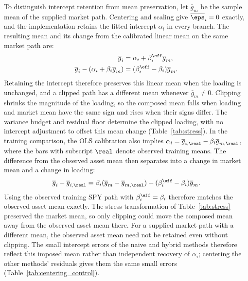 To distinguish intercept retention from mean preservation, let
$\overline{g}_m$ be the sample mean of the supplied market path.
Centering and scaling give $\overline{\eps}_i=0$ exactly, and the
implementation retains the fitted intercept $\alpha_i$ in every
branch. The resulting mean and its change from the calibrated linear
mean on the same market path are:
\begin{align}
  \overline{g}_i
    &= \alpha_i+\beta_i^{\eff}\overline{g}_m, \notag\\
  \overline{g}_i-(\alpha_i+\beta_i\overline{g}_m)
    &= (\beta_i^{\eff}-\beta_i)\overline{g}_m.
  \label{eq:supp-clipped-mean}
\end{align}
Retaining the intercept therefore preserves this linear mean when the
loading is unchanged, and a clipped path has a different mean whenever
$\overline{g}_m\ne0$. Clipping shrinks the magnitude of the loading,
so the composed mean falls when loading and market mean have the
same sign and rises when their signs differ. The variance
budget and residual floor determine the clipped loading, with no
intercept adjustment to offset this mean change
(Table~\ref{tab:stress}). In the training comparison, the OLS
calibration also implies
$\alpha_i=\overline{g}_{i,\real}-\beta_i\overline{g}_{m,\real}$,
where the bars with subscript $\real$ denote observed training means.
The difference from the observed asset mean then separates into a
change in market mean and a change in loading:
\begin{equation}
  \overline{g}_i-\overline{g}_{i,\real}
  = \beta_i(\overline{g}_m-\overline{g}_{m,\real})
    +(\beta_i^{\eff}-\beta_i)\overline{g}_m.
  \label{eq:supp-training-mean-shift}
\end{equation}
Using the observed training SPY path with $\beta_i^{\eff}=\beta_i$
therefore matches the observed asset mean exactly. The stress
transformation of Table~\ref{tab:stress} preserved the market mean, so
only clipping could move the composed mean away from the observed
asset mean there. For a supplied market path with a different mean,
the observed asset mean need not be retained even without clipping.
The small intercept errors of the naive and hybrid methods therefore
reflect this imposed mean rather than independent recovery of
$\alpha_i$; centering the other methods' residuals gives them the
same small errors (Table~\ref{tab:centering_control}).

